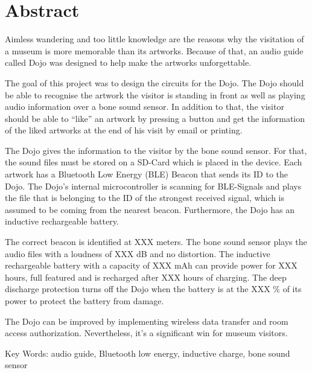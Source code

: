 \section*{Abstract}\label{sec:abstract}

Aimless wandering and too little knowledge are the reasons why the visitation of a museum is more memorable than its artworks. Because of that, an audio guide called Dojo was designed to help make the artworks unforgettable.

The goal of this project was to design the circuits for the Dojo. The Dojo should be able to recognise the artwork the visitor is standing in front as well as playing audio information over a bone sound sensor. In addition to that, the visitor should be able to “like” an artwork by pressing a button and get the information of the liked artworks at the end of his visit by email or printing.

The Dojo gives the information to the visitor by the bone sound sensor. For that, the sound files must be stored on a SD-Card which is placed in the device. Each artwork has a Bluetooth Low Energy (BLE) Beacon that sends its ID to the Dojo. The Dojo’s internal microcontroller is scanning for BLE-Signals and plays the file that is belonging to the ID of the strongest received signal, which is assumed to be coming from the nearest beacon. Furthermore, the Dojo has an inductive rechargeable battery.

The correct beacon is identified at XXX meters. The bone sound sensor plays the audio files with a loudness of XXX dB and no distortion. The inductive rechargeable battery with a capacity of XXX mAh can provide power for XXX hours, full featured and is recharged after XXX hours of charging. The deep discharge protection turns off the Dojo when the battery is at the XXX $\%$ of its power to protect the battery from damage.

The Dojo can be improved by implementing wireless data transfer and room access authorization. Nevertheless, it's a significant win for museum visitors.

Key Words: audio guide, Bluetooth low energy, inductive charge, bone sound sensor
